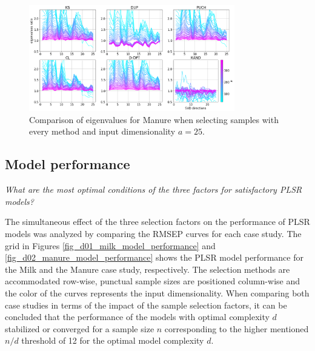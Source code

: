 \documentclass[journal=ancham,manuscript=article]{achemso}
\begin{document}
\begin{figure}[b]
\includegraphics[width=0.8\textwidth]{manuscript/figures/d02_manure_specific_framework_eigenvalsratio.png}
\centering
\caption{Comparison of eigenvalues for Manure when selecting samples with every method and input dimensionality $a=25$.}
\label{fig_d02_manure_specific_framework_eigenvalsratio}
\end{figure}

\subsection*{Model performance}\label{results:modperformance}


\emph{What are the most optimal conditions of the three factors for satisfactory PLSR models?}

The simultaneous effect of the three selection factors on the performance of PLSR models was analyzed by comparing the RMSEP curves for each case study. The grid in Figures \ref{fig_d01_milk_model_performance} and \ref{fig_d02_manure_model_performance} shows the PLSR model performance for the Milk and the Manure case study, respectively. The selection methods are accommodated row-wise, punctual sample sizes are positioned column-wise and the color of the curves represents the input dimensionality. When comparing both case studies in terms of the impact of the sample selection factors, it can be concluded that the performance of the models with optimal complexity $d$ stabilized or converged for a sample size $n$ corresponding to the higher mentioned $n/d$ threshold of 12 for the optimal model complexity $d$.
\end{document}
